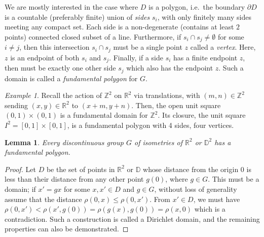 \documentclass[12pt]{article}
\newcommand{\Z}{\mathbb{Z}}
\newcommand{\R}{\mathbb{R}}
\newtheorem{lemma}[theorem]{Lemma}
\theoremstyle{definition}
\theoremstyle{remark}
\newtheorem*{example}{Example}
\begin{document}
    We are mostly interested in the case where $D$ is a polygon, i.e.\ the boundary
    $\partial D$ is a countable (preferably finite) union of \emph{sides} $s_i$, with
    only finitely many sides meeting any compact set. Each side is a non-degenerate
    (contains at least $2$ points) connected closed subset of a line. Furthermore, if
    $s_i \cap s_j \neq \emptyset$ for some $i \neq j$, then this intersection $s_i
    \cap s_j$ must be a single point $z$ called a \emph{vertex}. Here, $z$ is an
    endpoint of both $s_i$ and $s_j$. Finally, if a side $s_i$ has a finite endpoint
    $z$, then must be exactly one other side $s_j$ which also has the endpoint $z$.
    Such a domain is called a \emph{fundamental polygon} for $G$.

    \begin{example}
        Recall the action of $\Z^2$ on $\R^2$ via translations, with $(m, n) \in
        \Z^2$ sending $(x, y) \in \R^2$ to $(x + m, y + n)$. Then, the open unit
        square $(0, 1) \times (0, 1)$ is a fundamental domain for $\Z^2$. Its
        closure, the unit square $I^2 = [0, 1] \times [0, 1]$, is a fundamental
        polygon with 4 sides, four vertices.
    \end{example}
    \vspace{1em}

    \begin{lemma}
        Every discontinuous group $G$ of isometries of $\R^2$ or $\mathbb{D}^2$ has a
        fundamental polygon.
    \end{lemma}
    \begin{proof}
        Let $D$ be the set of points in $\R^2$ or $\mathbb{D}$ whose distance from
        the origin $0$ is less than their distance from any other point $g(0)$, where
        $g \in G$. This must be a domain; if $x' = gx$ for some $x, x' \in D$ and $g
        \in G$, without loss of generality assume that the distance $\rho(0, x) \leq
        \rho(0, x')$. From $x' \in D$, we must have $\rho(0, x') < \rho(x', g(0)) =
        \rho(g(x), g(0)) = \rho(x, 0)$ which is a contradiction. Such a construction
        is called a Dirichlet domain, and the remaining properties can also be
        demonstrated.
    \end{proof}
\end{document}
